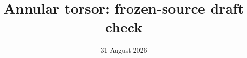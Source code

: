 \documentclass[11pt]{article}
\begin{document}
\title{Annular torsor: frozen-source draft check}
\author{}
\date{31 August 2026}
\maketitle




\end{document}
